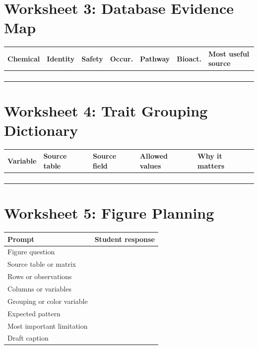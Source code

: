 \section{Worksheet 3: Database Evidence Map}
\begin{tabularx}{\textwidth}{p{}p{}p{}p{}p{}p{}Y}
\toprule
\textbf{Chemical} & \textbf{Identity} & \textbf{Safety} & \textbf{Occur.} & \textbf{Pathway} & \textbf{Bioact.} & \textbf{Most useful source}\\
\midrule
\rule{0pt}{2em} & & & & & &\\
\rule{0pt}{2em} & & & & & &\\
\rule{0pt}{2em} & & & & & &\\
\rule{0pt}{2em} & & & & & &\\
\bottomrule
\end{tabularx}

\section{Worksheet 4: Trait Grouping Dictionary}
\begin{tabularx}{\textwidth}{p{}p{}p{}p{}Y}
\toprule
\textbf{Variable} & \textbf{Source table} & \textbf{Source field} & \textbf{Allowed values} & \textbf{Why it matters}\\
\midrule
\rule{0pt}{2em} & & & &\\
\rule{0pt}{2em} & & & &\\
\rule{0pt}{2em} & & & &\\
\rule{0pt}{2em} & & & &\\
\bottomrule
\end{tabularx}

\section{Worksheet 5: Figure Planning}
\begin{tabularx}{\textwidth}{p{}Y}
\toprule
\textbf{Prompt} & \textbf{Student response}\\
\midrule
Figure question & \rule{0pt}{3em}\\
Source table or matrix & \rule{0pt}{2.5em}\\
Rows or observations & \rule{0pt}{2.5em}\\
Columns or variables & \rule{0pt}{2.5em}\\
Grouping or color variable & \rule{0pt}{2.5em}\\
Expected pattern & \rule{0pt}{3em}\\
Most important limitation & \rule{0pt}{3em}\\
Draft caption & \rule{0pt}{4em}\\
\bottomrule
\end{tabularx}

